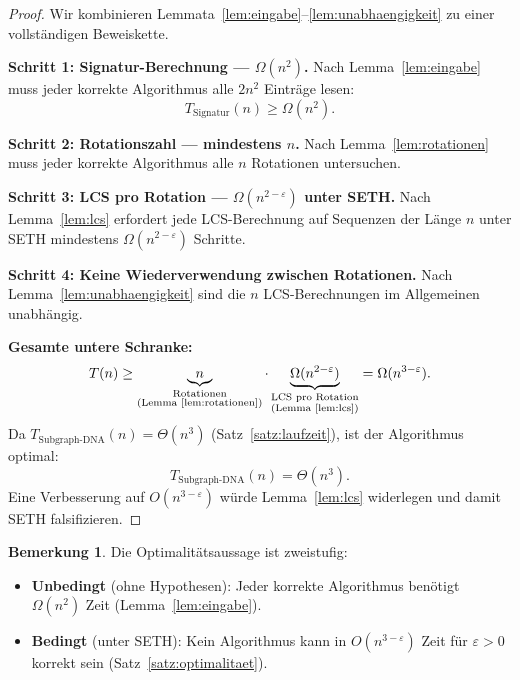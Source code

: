 ﻿\documentclass[a4paper,12pt]{article}
\theoremstyle{definition}
\newtheorem{bemerkung}{Bemerkung}
\begin{document}
\begin{proof}
    Wir kombinieren Lemmata~\ref{lem:eingabe}--\ref{lem:unabhaengigkeit}
    zu einer vollständigen Beweiskette.

    \textbf{Schritt 1: Signatur-Berechnung --- $\Omega(n^2)$.}
    Nach Lemma~\ref{lem:eingabe} muss jeder korrekte Algorithmus alle $2n^2$
    Einträge lesen:
    \[
        T_{\text{Signatur}}(n) \geq \Omega(n^2).
    \]

    \textbf{Schritt 2: Rotationszahl --- mindestens $n$.}
    Nach Lemma~\ref{lem:rotationen} muss jeder korrekte Algorithmus alle $n$
    Rotationen untersuchen.

    \textbf{Schritt 3: LCS pro Rotation --- $\Omega(n^{2-\varepsilon})$ unter SETH.}
    Nach Lemma~\ref{lem:lcs} erfordert jede LCS-Berechnung auf Sequenzen
    der Länge $n$ unter SETH mindestens $\Omega(n^{2-\varepsilon})$ Schritte.

    \textbf{Schritt 4: Keine Wiederverwendung zwischen Rotationen.}
    Nach Lemma~\ref{lem:unabhaengigkeit} sind die $n$ LCS-Berechnungen im
    Allgemeinen unabhängig.

    \textbf{Gesamte untere Schranke:}
    \[
        T(n) \geq
        \underbrace{n}_{\substack{\text{Rotationen}\\\text{(Lemma \ref{lem:rotationen})}}}
        \cdot
        \underbrace{\Omega(n^{2-\varepsilon})}_{\substack{\text{LCS pro Rotation}\\
        \text{(Lemma \ref{lem:lcs})}}}
        = \Omega(n^{3-\varepsilon}).
    \]
    Da $T_{\text{Subgraph-DNA}}(n) = \Theta(n^3)$ (Satz~\ref{satz:laufzeit}),
    ist der Algorithmus optimal:
    \[
        T_{\text{Subgraph-DNA}}(n) = \Theta(n^3).
    \]
    Eine Verbesserung auf $O(n^{3-\varepsilon})$ würde Lemma~\ref{lem:lcs}
    widerlegen und damit SETH falsifizieren. 
\end{proof}

\begin{bemerkung}
    Die Optimalitätsaussage ist zweistufig:
    \begin{itemize}
        \item \textbf{Unbedingt} (ohne Hypothesen): Jeder korrekte Algorithmus
              benötigt $\Omega(n^2)$ Zeit (Lemma~\ref{lem:eingabe}).
        \item \textbf{Bedingt} (unter SETH): Kein Algorithmus kann in
              $O(n^{3-\varepsilon})$ Zeit für $\varepsilon > 0$ korrekt sein
              (Satz~\ref{satz:optimalitaet}).
    \end{itemize}
\end{bemerkung}
\end{document}

